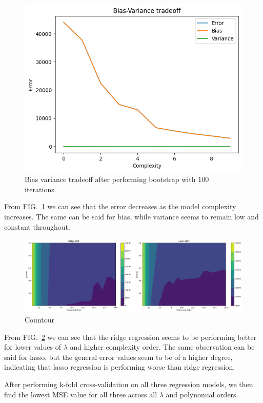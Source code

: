 \documentclass[aps,rmp,reprint,amsmath,amssymb,graphicx,longbibliography]{revtex4-1}
\begin{document}
\begin{figure}[H]
    \centering
    \includegraphics[width=0.6\linewidth]{Project_1/figures/Bias-Variance-Tradeoff-Bootstrap_Terrain.png}
    \caption{Bias variance tradeoff after performing bootstrap with 100 iterations.}
    \label{fig:bias-variance-terrain}
\end{figure}

From FIG.~\ref{fig:bias-variance-terrain} we can see that the error decreases as the model complexity increases. The same can be said for bias, while variance seems to remain low and constant throughout.

\begin{figure}[H]
    \centering
    \includegraphics[width=0.9\linewidth]{Project_1/figures/countour_heatmap_mse.png}
    \caption{Countour}
    \label{fig:countour}
\end{figure}

From FIG.~\ref{fig:countour} we can see that the ridge regression seems to be performing better for lower values of $\lambda$ and higher complexity order. The same observation can be said for lasso, but the general error values seem to be of a higher degree, indicating that lasso regression is performing worse than ridge regression.

After performing k-fold cross-validation on all three regression models, we then find the lowest MSE value for all three across all $\lambda$ and polynomial orders.
\end{document}
